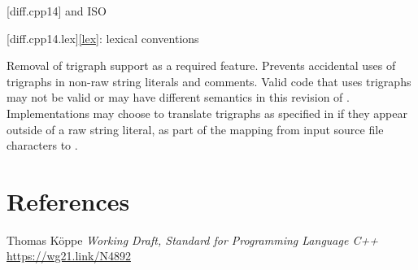 \documentclass{wg21}
\begin{document}
[diff.cpp14]{\Cpp{} and ISO \CppXIV{}}

[diff.cpp14.lex]{\ref{lex}: lexical conventions}

\change
Removal of trigraph support as a required feature.
\rationale
Prevents accidental uses of trigraphs in non-raw string literals and comments.
\effect
Valid \CppXIV{} code that uses trigraphs may not be valid or may have different
semantics in this revision of \Cpp{}. Implementations may choose to
translate trigraphs as specified in \CppXIV{} if they appear outside of a raw
string literal, as part of the  mapping from input source file characters to
.


\section{References}

\renewcommand{\section}[2]{}%



\begin{thebibliography}{9}

Thomas Köppe
\emph{Working Draft, Standard for Programming Language C++}\newline
\url{https://wg21.link/N4892}


\end{thebibliography}
\end{document}
